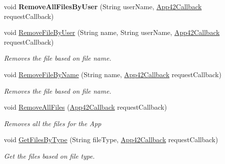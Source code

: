 \begin{DoxyCompactItemize}
\hypertarget{classcom_1_1shephertz_1_1app42_1_1paas_1_1sdk_1_1windows_1_1upload_1_1_upload_service_ad88e499a48afed473dc6239d48846dde}{void {\bfseries Remove\+All\+Files\+By\+User} (String user\+Name, \hyperlink{interfacecom_1_1shephertz_1_1app42_1_1paas_1_1sdk_1_1windows_1_1_app42_callback}{App42\+Callback} request\+Callback)}\label{classcom_1_1shephertz_1_1app42_1_1paas_1_1sdk_1_1windows_1_1upload_1_1_upload_service_ad88e499a48afed473dc6239d48846dde}

\item 
void \hyperlink{classcom_1_1shephertz_1_1app42_1_1paas_1_1sdk_1_1windows_1_1upload_1_1_upload_service_a223fd9326d73eacdc292ed758cb3174a}{Remove\+File\+By\+User} (String name, String user\+Name, \hyperlink{interfacecom_1_1shephertz_1_1app42_1_1paas_1_1sdk_1_1windows_1_1_app42_callback}{App42\+Callback} request\+Callback)
\begin{DoxyCompactList}\small\item\em Removes the file based on file name. \end{DoxyCompactList}\item 
void \hyperlink{classcom_1_1shephertz_1_1app42_1_1paas_1_1sdk_1_1windows_1_1upload_1_1_upload_service_afd27b402ca58747a25cdaaf6f0ef57c5}{Remove\+File\+By\+Name} (String name, \hyperlink{interfacecom_1_1shephertz_1_1app42_1_1paas_1_1sdk_1_1windows_1_1_app42_callback}{App42\+Callback} request\+Callback)
\begin{DoxyCompactList}\small\item\em Removes the file based on file name. \end{DoxyCompactList}\item 
void \hyperlink{classcom_1_1shephertz_1_1app42_1_1paas_1_1sdk_1_1windows_1_1upload_1_1_upload_service_abf2daf314a650557b45545e511e5cb85}{Remove\+All\+Files} (\hyperlink{interfacecom_1_1shephertz_1_1app42_1_1paas_1_1sdk_1_1windows_1_1_app42_callback}{App42\+Callback} request\+Callback)
\begin{DoxyCompactList}\small\item\em Removes all the files for the App \end{DoxyCompactList}\item 
void \hyperlink{classcom_1_1shephertz_1_1app42_1_1paas_1_1sdk_1_1windows_1_1upload_1_1_upload_service_ae68e8ad2550f7db9007a7d6607909c7b}{Get\+Files\+By\+Type} (String file\+Type, \hyperlink{interfacecom_1_1shephertz_1_1app42_1_1paas_1_1sdk_1_1windows_1_1_app42_callback}{App42\+Callback} request\+Callback)
\begin{DoxyCompactList}\small\item\em Get the files based on file type. \end{DoxyCompactList}\item 

\end{DoxyCompactItemize}
